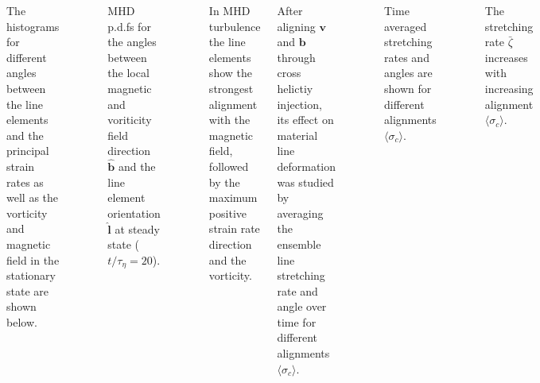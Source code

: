 \documentclass[20pt, a0paper, portrait, margin=15mm, innermargin=15mm,
     blockverticalspace=15mm, colspace=15mm, subcolspace=8mm]{tikzposter} %
\newcommand{\va}[1]{\bm{#1}}
\newcommand{\plot}[3]{
\begin{figure}[H]
    \centering
    \tiny
    \scalebox{1.3}{}
    \caption{\footnotesize{#2}}
    \label{#3}
\end{figure}
}
\begin{document}
\begin{columns}
{\begin{minipage}[t]{20cm}
				\vspace{1.0cm}


                The histograms for different angles between the line elements and the
                principal strain rates as well as the vorticity and magnetic field in the
                stationary state are shown below.

                \plot{figures/histograms/mhd_angle_histo_t20}
				{MHD p.d.fs for the angles between the local magnetic and voriticity field direction $\va{\hat{b}}$ and the
                    line element orientation $\va{\hat{l}}$ at steady state ($t/\tau_{\eta} = 20$).}
                    {mhd_strain_magnetic_angle_histo}

                \begin{itemsposter}
                    \item In MHD turbulence the line elements show the strongest
                        alignment with the magnetic field, followed by the 
                        maximum positive strain rate direction and the vorticity.
                \end{itemsposter}

            \end{minipage}
            \hfill
            \begin{minipage}[t]{20cm}


                     After aligning $\va{v}$ and $\va{b}$ through cross helictiy
                     injection, its effect on material line deformation was
                     studied by averaging the ensemble line stretching
                     rate and angle over time for different alignments $\langle
                     \sigma_c \rangle $.

                    \plot{figures/line_xhel_scaling_128}
						{Time averaged stretching rates and angles are shown for
                        different alignments $\langle \sigma_c \rangle$.}
						{xhel_scaling}

                    \begin{itemsposter}
                        \item The stretching rate $\bar{\zeta}$ increases with
                            increasing alignment $\langle \sigma_c \rangle$.

                        \vspace{0.5cm}


\end{itemsposter}
\end{minipage}}
\end{columns}
\end{document}
